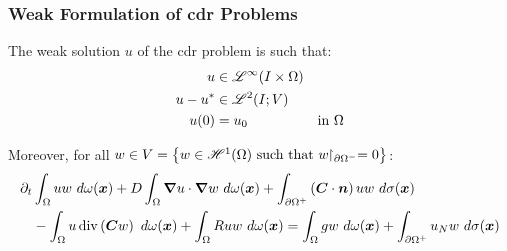 \begin{frame}
    \frametitle{Weak Formulation of \acrshort{cdr} Problems}

    \vspace*{\fill}
    \begin{center}
        \begin{minipage}{0.75\textwidth}
            \begin{definition}
                The weak solution $u$ of the \acrshort{cdr} problem is such that:
                \begin{align*}
                    u &\in \mathscr{L}^{\infty}(I \times \Omega) \\
                    u - u^* &\in \mathscr{L}^{2}(I; V) \\
                    u(0) &= u_0 &\text{in } \Omega
                \end{align*}

                Moreover, for all $w \in V =  \left\{ w \in \mathscr{H}^{1}(\Omega) \text{ such that } w \!\!\restriction_{\partial \Omega^-} = 0 \right\}$:
                \begin{align*}
                    \partial_t & \int_{\Omega} u w ~ d \omega(\bm{x}) + D \int_{\Omega} \bm{\nabla} u \cdot \bm{\nabla} w ~ d \omega(\bm{x}) + \int_{\partial \Omega^+} \left( \bm{C} \cdot \bm{n} \right) u w ~ d \sigma(\bm{x}) \\ 
                    &- \int_{\Omega} u \operatorname*{div} \left( \bm{C} w \right) ~ d \omega(\bm{x}) + \int_{\Omega} R u w ~ d \omega(\bm{x}) = \int_{\Omega} g w ~ d \omega(\bm{x}) + \int_{\partial \Omega^+} u_N w ~ d \sigma(\bm{x})
                \end{align*}
            \end{definition}
        \end{minipage}
    \end{center}
    \vspace*{\fill}
    
\end{frame}

